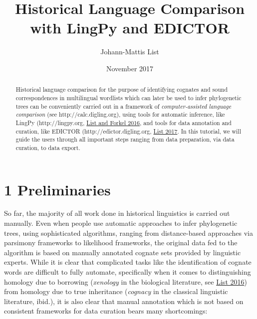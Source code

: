 \documentclass[a4paper,svgnames]{scrartcl}
\title{Historical Language Comparison with LingPy and EDICTOR}
\author{Johann-Mattis List}
\date{November 2017}
\begin{document}
\maketitle
\begin{abstract}
Historical language comparison for the purpose of identifying cognates
and sound correspondences in multilingual wordlists which can later be
used to infer phylogenetic trees can be conveniently carried out in a
framework of \emph{computer-assisted language comparison} (see
http://calc.digling.org), using tools for automatic inference, like
LingPy (http://lingpy.org,
\href{http://bibliography.lingpy.org?key=List2016e}{List and Forkel
2016}, and tools for data annotation and curation, like EDICTOR
(http://edictor.digling.org,
\href{http://bibliography.lingpy.org?key=List2017d}{List 2017}. In this
tutorial, we will guide the users through all important steps ranging
from data preparation, via data curation, to data export.
\end{abstract}


\section*{1 Preliminaries}\label{preliminaries}

So far, the majority of all work done in historical linguistics is
carried out manually. Even when people use automatic approaches to infer
phylogenetic trees, using sophisticated algorithms, ranging from
distance-based approaches via parsimony frameworks to likelihood
frameworks, the original data fed to the algorithm is based on manually
annotated cognate sets provided by linguistic experts. While it is clear
that complicated tasks like the identification of cognate words are
difficult to fully automate, specifically when it comes to
distinguishing homology due to borrowing (\emph{xenology} in the
biological literature, see
\href{http://bibliography.lingpy.org?key=List2016f}{List 2016}) from
homology due to true inheritance (\emph{cognacy} in the classical
linguistic literature, ibid.), it is also clear that manual annotation
which is not based on consistent frameworks for data curation bears many
shortcomings:
\end{document}
